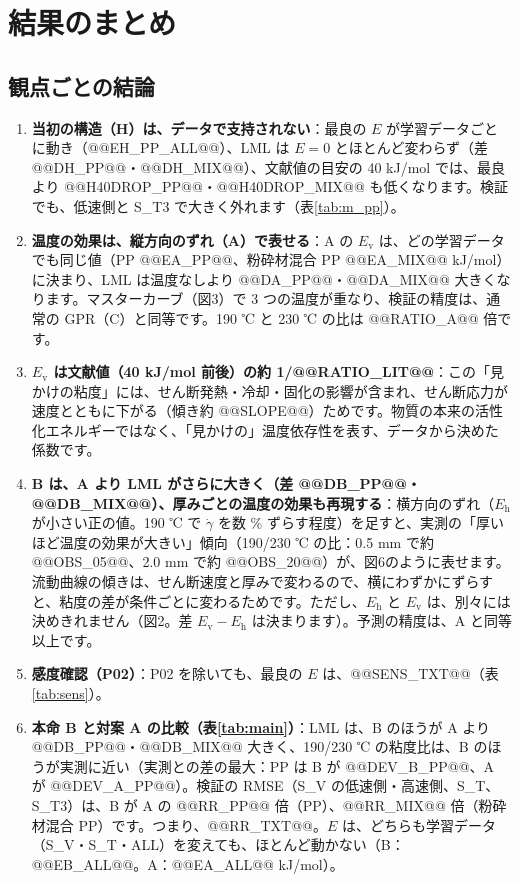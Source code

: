 \documentclass[paper=a4paper,fontsize=10.5pt,line_length=44zw,number_of_lines=38]{jlreq}
\newcommand{\gd}{\dot{\gamma}}
\newcommand{\Eh}{E_{\mathrm{h}}}
\newcommand{\Ev}{E_{\mathrm{v}}}
\begin{document}
\section{結果のまとめ}

\subsection{観点ごとの結論}
\begin{enumerate}[itemsep=0.6ex,topsep=0.6ex]
\item \textbf{当初の構造（H）は、データで支持されない}：最良の $E$ が学習データごとに動き（@@EH_PP_ALL@@）、LML は $E=0$ とほとんど変わらず（差 @@DH_PP@@・@@DH_MIX@@）、文献値の目安の 40 kJ/mol では、最良より @@H40DROP_PP@@・@@H40DROP_MIX@@ も低くなります。検証でも、低速側と S\_T3 で大きく外れます（表\ref{tab:m_pp}）。
\item \textbf{温度の効果は、縦方向のずれ（A）で表せる}：A の $\Ev$ は、どの学習データでも同じ値（PP @@EA_PP@@、粉砕材混合 PP @@EA_MIX@@ kJ/mol）に決まり、LML は温度なしより @@DA_PP@@・@@DA_MIX@@ 大きくなります。マスターカーブ（図3）で 3 つの温度が重なり、検証の精度は、通常の GPR（C）と同等です。190 ℃ と 230 ℃ の比は @@RATIO_A@@ 倍です。
\item \textbf{$\Ev$ は文献値（40 kJ/mol 前後）の約 1/@@RATIO_LIT@@}：この「見かけの粘度」には、せん断発熱・冷却・固化の影響が含まれ、せん断応力が速度とともに下がる（傾き約 @@SLOPE@@）ためです。物質の本来の活性化エネルギーではなく、「見かけの」温度依存性を表す、データから決めた係数です。
\item \textbf{B は、A より LML がさらに大きく（差 @@DB_PP@@・@@DB_MIX@@）、厚みごとの温度の効果も再現する}：横方向のずれ（$\Eh$ が小さい正の値。190 ℃ で $\gd$ を数 \% ずらす程度）を足すと、実測の「厚いほど温度の効果が大きい」傾向（190/230 ℃ の比：0.5 mm で約 @@OBS_05@@、2.0 mm で約 @@OBS_20@@）が、図6のように表せます。流動曲線の傾きは、せん断速度と厚みで変わるので、横にわずかにずらすと、粘度の差が条件ごとに変わるためです。ただし、$\Eh$ と $\Ev$ は、別々には決めきれません（図2。差 $\Ev-\Eh$ は決まります）。予測の精度は、A と同等以上です。
\item \textbf{感度確認（P02）}：P02 を除いても、最良の $E$ は、@@SENS_TXT@@（表\ref{tab:sens}）。
\item \textbf{本命 B と対案 A の比較（表\ref{tab:main}）}：LML は、B のほうが A より @@DB_PP@@・@@DB_MIX@@ 大きく、190/230 ℃ の粘度比は、B のほうが実測に近い（実測との差の最大：PP は B が @@DEV_B_PP@@、A が @@DEV_A_PP@@）。検証の RMSE（S\_V の低速側・高速側、S\_T、S\_T3）は、B が A の @@RR_PP@@ 倍（PP）、@@RR_MIX@@ 倍（粉砕材混合 PP）です。つまり、@@RR_TXT@@。$E$ は、どちらも学習データ（S\_V・S\_T・ALL）を変えても、ほとんど動かない（B：@@EB_ALL@@。A：@@EA_ALL@@ kJ/mol）。

\end{enumerate}
\end{document}
